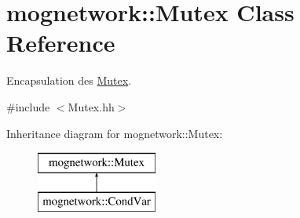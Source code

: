 \hypertarget{classmognetwork_1_1_mutex}{\section{mognetwork\-:\-:Mutex Class Reference}
\label{classmognetwork_1_1_mutex}
}


Encapsulation des \hyperlink{classmognetwork_1_1_mutex}{Mutex}.  




{\ttfamily \#include $<$Mutex.\-hh$>$}

Inheritance diagram for mognetwork\-:\-:Mutex\-:\begin{figure}[H]
\begin{center}
\leavevmode
\includegraphics[height=2.000000cm]{classmognetwork_1_1_mutex}
\end{center}
\end{figure}
